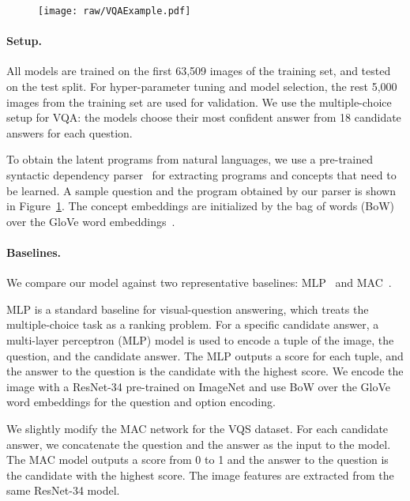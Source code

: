 \documentclass{article} \usepackage{iclr2019_conference,times}
\begin{document}
{\begin{figure}[thbp]
    \centering
    \texttt{[image: raw/VQAExample.pdf]}
    \label{fig:vqs:example}
\end{figure}

\paragraph{Setup. } All models are trained on the first 63,509 images of the training set, and tested on the test split. For hyper-parameter tuning and model selection, the rest 5,000 images from the training set are used for validation. We use the multiple-choice setup for VQA: the models choose their most confident answer from 18 candidate answers for each question.

To obtain the latent programs from natural languages, we use a pre-trained syntactic dependency parser~\citep{Andreas2016Learning,Schuster2015Generating} for extracting programs and concepts that need to be learned. A sample question and the program obtained by our parser is shown in Figure~\ref{fig:vqs:example}. The concept embeddings are initialized by the bag of words (BoW) over the GloVe word embeddings~\citep{pennington2014glove}.

\paragraph{Baselines. } We compare our model against two representative baselines: MLP~\citep{Jabri2016Revisiting} and MAC~\citep{Hudson2018Compositional}.

MLP is a standard baseline for visual-question answering, which treats the multiple-choice task as a ranking problem. For a specific candidate answer, a multi-layer perceptron (MLP) model is used to encode a tuple of the image, the question, and the candidate answer. The MLP outputs a score for each tuple, and the answer to the question is the candidate with the highest score. We encode the image with a ResNet-34 pre-trained on ImageNet and use BoW over the GloVe word embeddings for the question and option encoding.

We slightly modify the MAC network for the VQS dataset. For each candidate answer, we concatenate the question and the answer as the input to the model. The MAC model outputs a score from 0 to 1 and the answer to the question is the candidate with the highest score. The image features are extracted from the same ResNet-34 model.

}
\end{document}

